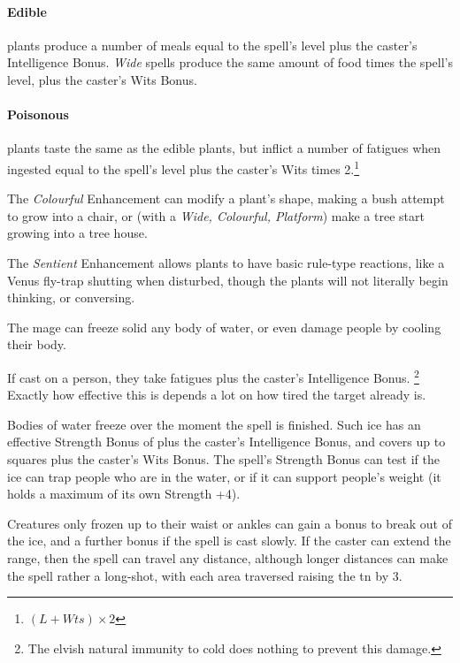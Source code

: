 \begin{multicols}{2}
\paragraph{Edible} plants produce a number of meals equal to the spell's level plus the caster's Intelligence Bonus.
\textit{Wide} spells produce the same amount of food times the spell's level, plus the caster's Wits Bonus.

\paragraph{Poisonous} plants taste the same as the edible plants, but inflict a number of \glspl{fatigue} when ingested equal to the spell's level plus the caster's Wits times 2.\footnote{$(L + Wts)\times 2$}

The \textit{Colourful} Enhancement can modify a plant's shape, making a bush attempt to grow into a chair, or (with a \textit{Wide, Colourful, Platform}) make a tree start growing into a tree house.

The \textit{Sentient} Enhancement allows plants to have basic rule-type reactions, like a Venus fly-trap shutting when disturbed, though the plants will not literally begin thinking, or conversing.

\label{spellFreeze}

The mage can freeze solid any body of water, or even damage people by cooling their body.

If cast on a person, they take  \glspl{fatigue} plus the caster's Intelligence Bonus.%
\footnote{The elvish natural immunity to cold does nothing to prevent this damage.}
Exactly how effective this is depends a lot on how tired the target already is.

Bodies of water freeze over the moment the spell is finished.
Such ice has an effective Strength Bonus of  plus the caster's Intelligence Bonus, and covers up to  squares plus the caster's Wits Bonus.
The spell's Strength Bonus can test if the ice can trap people who are in the water, or if it can support people's weight (it holds a maximum  of its own Strength +4).

Creatures only frozen up to their waist or ankles can gain a bonus to break out of the ice, and a further bonus if the spell is cast slowly.
If the caster can extend the range, then the spell can travel any distance, although longer distances can make the spell rather a long-shot, with each area traversed raising the \gls{tn} by 3.


\end{multicols}
